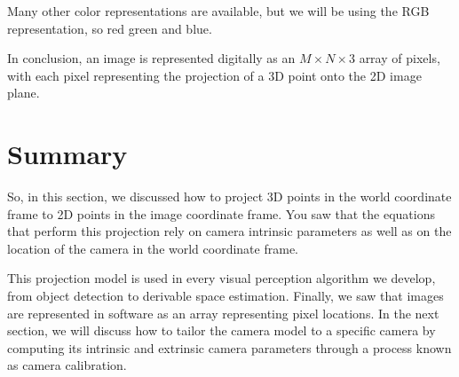 Many other color representations are available, but we will be using
the RGB representation, so red green and blue. 

In conclusion, an image is represented digitally as an $M \times N \times 3$ array of pixels, with each pixel
representing the projection of a 3D point onto
the 2D image plane. 

\section{Summary}

So, in this section, we discussed how to project 3D points in the world coordinate frame to 2D points in
the image coordinate frame. You saw that the equations that perform this projection rely on camera intrinsic
parameters as well as on the location of the camera in the world coordinate frame.  

This projection model is used in every visual perception algorithm we develop, from object detection to
derivable space estimation. Finally, we saw that images are represented in software as an array
representing pixel locations.  In the next section, we will discuss how to
tailor the camera model to a specific camera by computing its intrinsic and extrinsic
camera parameters through a process known as camera calibration.
